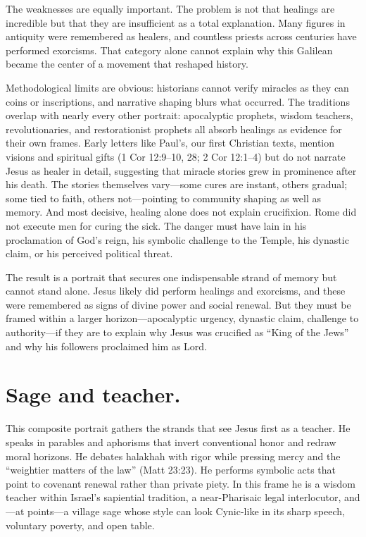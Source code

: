 The weaknesses are equally important.
The problem is not that healings are incredible but that they are insufficient as a total explanation.
Many figures in antiquity were remembered as healers, and countless priests across centuries have performed exorcisms.
That category alone cannot explain why this Galilean became the center of a movement that reshaped history.

Methodological limits are obvious: historians cannot verify miracles as they can coins or inscriptions, and narrative shaping blurs what occurred.
The traditions overlap with nearly every other portrait: apocalyptic prophets, wisdom teachers, revolutionaries, and restorationist prophets all absorb healings as evidence for their own frames.
Early letters like Paul’s, our first Christian texts, mention visions and spiritual gifts (1 Cor 12:9--10, 28; 2 Cor 12:1--4) but do not narrate Jesus as healer in detail, suggesting that miracle stories grew in prominence after his death.
The stories themselves vary---some cures are instant, others gradual; some tied to faith, others not---pointing to community shaping as well as memory.
And most decisive, healing alone does not explain crucifixion.
Rome did not execute men for curing the sick.
The danger must have lain in his proclamation of God’s reign, his symbolic challenge to the Temple, his dynastic claim, or his perceived political threat.

The result is a portrait that secures one indispensable strand of memory but cannot stand alone.
Jesus likely did perform healings and exorcisms, and these were remembered as signs of divine power and social renewal.
But they must be framed within a larger horizon---apocalyptic urgency, dynastic claim, challenge to authority---if they are to explain why Jesus was crucified as “King of the Jews” and why his followers proclaimed him as Lord.

\section{Sage and teacher.}\label{sec:teacher}

This composite portrait gathers the strands that see Jesus first as a teacher.
He speaks in parables and aphorisms that invert conventional honor and redraw moral horizons.
He debates halakhah with rigor while pressing mercy and the “weightier matters of the law” (Matt 23:23).
He performs symbolic acts that point to covenant renewal rather than private piety.
In this frame he is a wisdom teacher within Israel’s sapiential tradition, a near-Pharisaic legal interlocutor, and---at points---a village sage whose style can look Cynic-like in its sharp speech, voluntary poverty, and open table.

